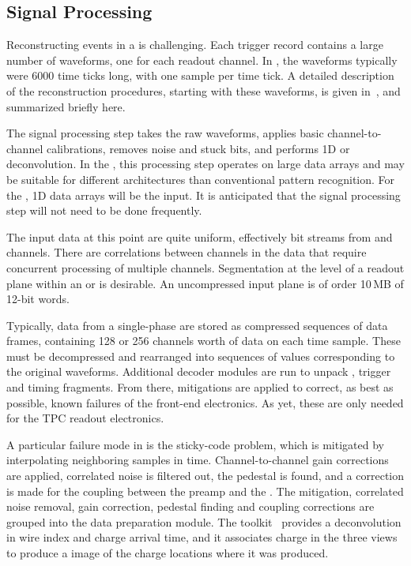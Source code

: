 \documentclass[../main-v1.tex]{subfiles}
\begin{document}
\subsection{Signal Processing }

Reconstructing events in a  is challenging.  Each trigger record contains a large number of waveforms, one for each readout channel.  In , the waveforms typically were 6000 time ticks long, with one  sample per time tick.  A detailed description of the reconstruction procedures, starting with these waveforms, is given in~\cite{Abi:2020mwi}, and summarized briefly here.


The signal processing step takes the raw waveforms, applies  basic channel-to-channel calibrations, removes noise and stuck bits, and performs 1D or \twod deconvolution.   In the , this processing step operates on large \twod data arrays and may be suitable for different architectures than conventional pattern recognition. For the , 1D data arrays will be the input. It is anticipated that the signal processing step will not need to be done frequently. 

The input data at this point are quite uniform, effectively bit streams from  and  channels.  There are correlations between channels in the  data that require concurrent processing of multiple channels.  Segmentation at the level of a readout plane within an   or  is desirable.  An uncompressed input  plane is of order 10\,MB of 12-bit words. 



Typically, data from a single-phase   are stored as compressed sequences of data frames, containing 128 or 256 channels worth of data on each time sample.  These must be decompressed and rearranged into sequences of  values corresponding to the original waveforms.  Additional decoder modules are run to unpack ,  trigger and timing  fragments.
From there, mitigations are applied to correct, as best as possible, known failures of the front-end electronics.  As yet, these are only needed for the TPC readout electronics.  

A particular failure mode in  is the sticky-code problem, which is mitigated by interpolating neighboring  samples in time.  Channel-to-channel gain corrections are applied, correlated noise is filtered out, the pedestal is found, and a correction is made for the  coupling between the preamp and the .  The  mitigation, correlated noise removal, gain correction, pedestal finding and  coupling corrections are grouped into the data preparation module.  The  toolkit~\cite{wirecell,ref:wire_cell_toolkit,ref:pdune_signal_processing} provides a \twod deconvolution in wire index and charge arrival time, and it associates charge in the three views to produce a \threed image of the charge locations where it was produced.  
\end{document}
